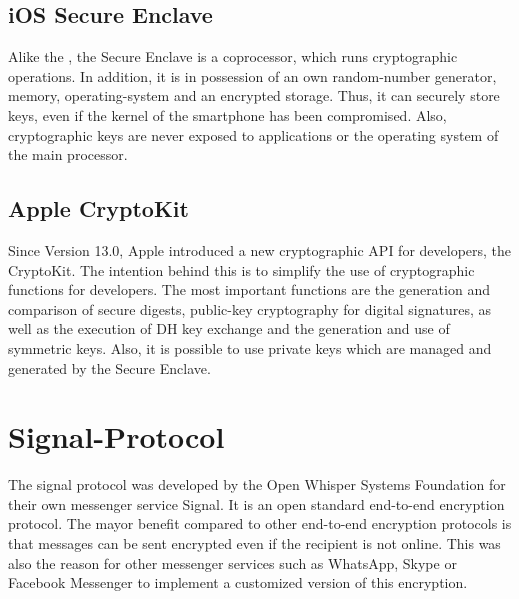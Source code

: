 \documentclass[12pt,oneside,a4paper,parskip]{scrbook}
\begin{document}

\subsection{iOS Secure Enclave}

Alike the , the Secure Enclave is a coprocessor, which runs cryptographic operations. In addition, it is in possession of an own random-number generator, memory, operating-system and an encrypted storage. Thus, it can securely store keys, even if the kernel of the smartphone has been compromised. Also, cryptographic keys are never exposed to applications or the operating system of the main processor.
\parencite{apple_storing_2020} 

\subsection{Apple CryptoKit}

Since Version 13.0, Apple introduced a new cryptographic API for developers, the CryptoKit. The intention behind this is to simplify the use of cryptographic functions for developers. The most important functions are the generation and comparison of secure digests, public-key cryptography for digital signatures, as well as the execution of DH key exchange and the generation and use of symmetric keys. Also, it is possible to use private keys which are managed and generated by the Secure Enclave.





\newpage
\section{Signal-Protocol}

The signal protocol was developed by the Open Whisper Systems Foundation for their own messenger service Signal. It is an open standard end-to-end encryption protocol. The mayor benefit compared to other end-to-end encryption protocols is that messages can be sent encrypted even if the recipient is not online. This was also the reason for other messenger services such as WhatsApp, Skype or Facebook Messenger to implement a customized version of this encryption. 
\parencite{protocol_introducing_2018}
\end{document}
